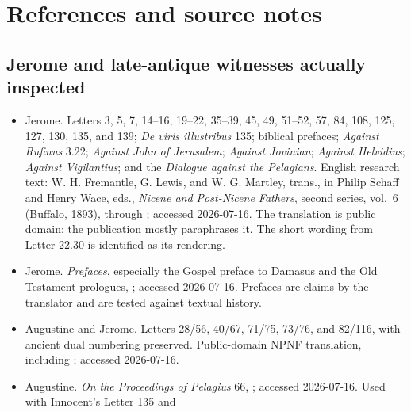 \section{References and source notes}\label{sec:jerome-references}

\begingroup
\setlength{\parskip}{0.15em}
\titlespacing*{\subsection}{0pt}{1.35ex}{0.45ex}

\subsection{Jerome and late-antique witnesses actually inspected}

\begin{itemize}
\item Jerome. Letters 3, 5, 7, 14--16, 19--22, 35--39, 45, 49, 51--52, 57,
84, 108, 125, 127, 130, 135, and 139; \emph{De viris illustribus} 135;
biblical prefaces;
\emph{Against Rufinus} 3.22; \emph{Against John of Jerusalem}; \emph{Against
Jovinian}; \emph{Against Helvidius}; \emph{Against Vigilantius}; and the
\emph{Dialogue against the Pelagians}. English research
text: W. H. Fremantle, G. Lewis, and W. G. Martley, trans., in Philip Schaff and
Henry Wace, eds., \emph{Nicene and Post-Nicene Fathers}, second series, vol.~6
(Buffalo, 1893), through
; accessed 2026-07-16. The translation is public domain; the publication
mostly paraphrases it. The short wording from Letter 22.30 is identified as its
rendering.
\item Jerome. \emph{Prefaces}, especially the Gospel preface to Damasus and the
Old Testament prologues,
; accessed 2026-07-16. Prefaces are claims by the translator and
are tested against textual history.
\item Augustine and Jerome. Letters 28/56, 40/67, 71/75, 73/76, and 82/116,
with ancient dual numbering preserved. Public-domain NPNF translation,
including
; accessed 2026-07-16.
\item Augustine. \emph{On the Proceedings of Pelagius} 66,
; accessed 2026-07-16. Used with Innocent's Letter 135 and

\end{itemize}
